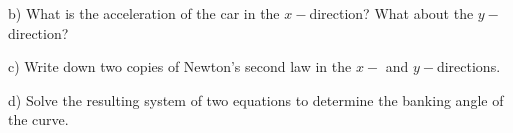 \documentclass[12pt]{article}
\begin{document}
\vspace{2in}

b) What is the acceleration of the car in the $x-$direction? What about the $y-$direction?

\vspace{1in}

c) Write down two copies of Newton's second law in the $x-$ and $y-$directions.

\vspace{1.5in}

d) Solve the resulting system of two equations to determine the banking angle of the curve.
\end{document}
